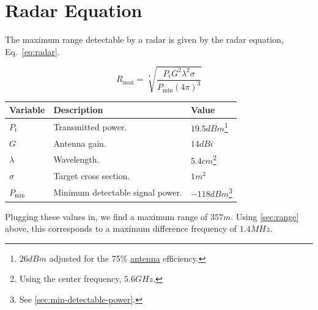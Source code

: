 \documentclass{default}
\begin{document}
\section{Radar Equation}
\label{sec:radar-equation}


The maximum range detectable by a radar is given by the radar equation, Eq.~\ref{eq:radar}.

\begin{equation}
        \label{eq:radar}
        R_{\text{max}} = \sqrt[4]{\frac{P_{\text{t}} G^2 \lambda^2 \sigma}{P_{\text{min}} {(4
              \pi)}^3}}
\end{equation}

\label{tab:radar-equation}
\begin{tabularx}{\textwidth}{l X l}
        \toprule
        Variable & Description & Value \\
        \midrule
        $P_{\text{t}}$ & Transmitted power. & $19.5 \si{dBm}$\footnote{$26 \si{dBm}$ adjusted for
          the 75\% \hyperref[sec:antenna-transmission]{antenna} efficiency.} \\
        $G$ & Antenna gain. & $14 \si{dBi}$ \\
        $\lambda$ & Wavelength. & $5.4 \si{cm}$\footnote{Using the center frequency, $5.6 \si{GHz}$.} \\
        $\sigma$ & Target cross section. & $1 \si{m^2}$ \\
        $P_{\text{min}}$ & Minimum detectable signal power. & $-118 \si{dBm}$\footnote{See
          \cref{sec:min-detectable-power}.} \\
        \bottomrule
\end{tabularx}

Plugging these values in, we find a maximum range of $357 \si{m}$. Using \cref{sec:range} above,
this corresponds to a maximum difference frequency of $1.4 \si{MHz}$.
\end{document}
